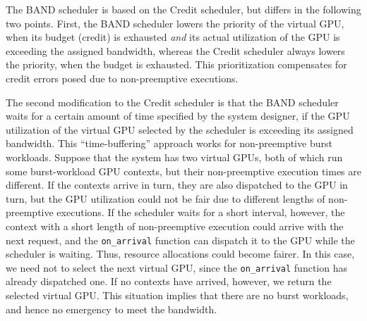 The BAND scheduler is based on the Credit scheduler, but differs in the
following two points.
First, the BAND scheduler lowers the priority of the virtual GPU, when
its budget (credit) is exhausted \textit{and} its actual utilization of
the GPU is exceeding the assigned bandwidth, whereas the Credit
scheduler always lowers the priority, when the budget is exhausted.
This prioritization compensates for credit errors posed due to
non-preemptive executions.

The second modification to the Credit scheduler is that the BAND
scheduler waits for a certain amount of time specified by the system
designer, if the GPU utilization of the virtual GPU selected
by the scheduler is exceeding its assigned bandwidth.
This ``time-buffering'' approach works for non-preemptive burst workloads.
Suppose that the system has two virtual GPUs, both of which run some
burst-workload GPU contexts, but their non-preemptive execution times
are different.
If the contexts arrive in turn, they are also dispatched to the GPU in
turn, but the GPU utilization could not be fair due to different lengths
of non-preemptive executions.
If the scheduler waits for a short interval, however, the context with a
short length of non-preemptive execution could arrive with the next
request, and the \texttt{on\_arrival} function can dispatch it to the
GPU while the scheduler is waiting.
Thus, resource allocations could become fairer.
In this case, we need not to select the next virtual GPU, since the
\texttt{on\_arrival} function has already dispatched one.
If no contexts have arrived, however, we return the selected virtual GPU.
This situation implies that there are no burst workloads, and hence no
emergency to meet the bandwidth.
